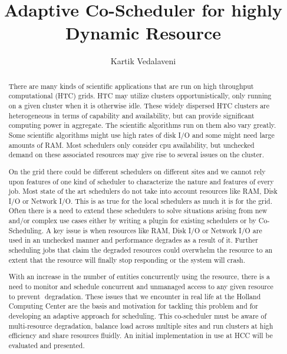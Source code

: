 \documentclass[ms,electronic,double]{nuthesis}
\begin{document}
\frontmatter
\title{Adaptive Co-Scheduler for highly Dynamic Resource}
\author{Kartik Vedalaveni}
\maketitle

\begin{abstract}
 There are many kinds of scientific applications that are run on high throughput computational (HTC) 
grids\cite{hccwebsite}. HTC may utilize clusters opportunistically, only running on a given cluster 
when it is otherwise idle. These widely dispersed HTC clusters are heterogeneous in terms of 
capability and availability, but can provide significant computing power in aggregate. The scientific 
algorithms run on them also vary greatly. Some scientific algorithms might use high rates of disk I/O 
and some might need large amounts of RAM. Most schedulers only consider cpu availability, but 
unchecked demand on these associated resources may give rise to several issues on the cluster.

On the grid there could be different schedulers on different sites and we cannot rely upon features 
of one kind of scheduler to characterize the nature and features of every job. Most state of the art 
schedulers do not take into account resources like RAM, Disk I/O or Network I/O. This is as true for the
 local schedulers as much it is for the grid. Often there is a need to extend these schedulers to solve 
 situations arising from new and/or complex use cases either by writing a plugin for existing schedulers or by Co­Scheduling. 
 A key issue is when resources like RAM, Disk I/O or Network I/O are used in an unchecked manner and 
 performance degrades as a result of it. Further scheduling jobs that claim the degraded resources could 
 overwhelm the resource to an extent that the resource will finally stop responding or the system will crash. 

With an increase in the number of entities concurrently using the resource, there is a need to monitor and schedule concurrent and unmanaged access to any given resource to prevent  degradation. These issues that we encounter in real life at the Holland Computing Center \cite{hccwebsite} 
are the basis and motivation for tackling this problem and for developing an adaptive approach for scheduling. 
This co-scheduler must be aware of multi­-resource degradation, balance load across multiple sites and 
run clusters at high efficiency and share resources fluidly. An initial implementation in use at HCC will 
be evaluated and presented. 

  
\end{abstract}
\end{document}
